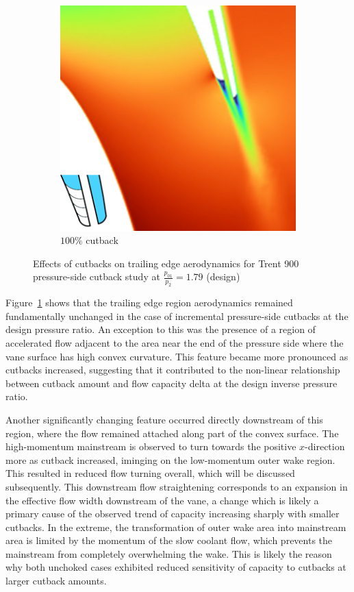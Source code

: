 \documentclass[a4paper, 11pt, oneside]{report}
\begin{document}
\begin{figure}[H]
\begin{subfigure}{.15\textwidth}
	\end{subfigure}
	\begin{subfigure}{.42\textwidth}
		\centering
		\includegraphics[width=\linewidth]{figs/ps_cutbacks_design_100.png}
		\caption{$100\%$ cutback}
	\end{subfigure}
	\caption{Effects of cutbacks on trailing edge aerodynamics for Trent 900 pressure-side cutback study at $\frac{p_{01}}{p_2}=1.79$ (design)}
	\label{fig:ps_cutbacks_design}
\end{figure}

Figure~\ref{fig:ps_cutbacks_design} shows that the trailing edge region aerodynamics remained fundamentally unchanged in the case of incremental pressure-side cutbacks at the design pressure ratio. An exception to this was the presence of a region of accelerated flow adjacent to the area near the end of the pressure side where the vane surface has high convex curvature. This feature became more pronounced as cutbacks increased, suggesting that it contributed to the non-linear relationship between cutback amount and flow capacity delta at the design inverse pressure ratio. 

Another significantly changing feature occurred directly downstream of this region, where the flow remained attached along part of the convex surface. The high-momentum mainstream is observed to turn towards the positive $x$-direction more as cutback increased, iminging on the low-momentum outer wake region. This resulted in reduced flow turning overall, which will be discussed subsequently. This downstream flow straightening corresponds to an expansion in the effective flow width downstream of the vane, a change which is likely a primary cause of the observed trend of capacity increasing sharply with smaller cutbacks. In the extreme, the transformation of outer wake area into mainstream area is limited by the momentum of the slow coolant flow, which prevents the mainstream from completely overwhelming the wake. This is likely the reason why both unchoked cases exhibited reduced sensitivity of capacity to cutbacks at larger cutback amounts.
\end{document}
